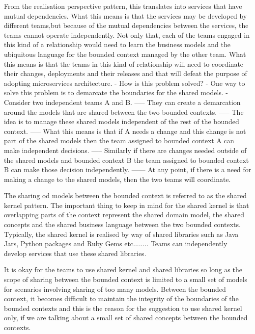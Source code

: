 \documentclass[a4paper, 11pt]{book}
\begin{document}
    From the realisation perspective pattern, this translates into services that have mutual dependencies.
    What this means is that the services may be developed by different teams,but because of the mutual dependencies between the services, the teams cannot operate independently.
    Not only that, each of the teams engaged in this kind of a relationship would need to learn the business models and the ubiquitous language for the bounded context managed by the other team.
    What this means is that the teams in this kind of relationship will need to coordinate their changes, deployments and their releases and that will defeat the purpose of adopting microservices architecture.
    - How is this problem solved?
    - One way to solve this problem is to demarcate the boundaries for the shared models.
    - Consider two independent teams A and B.
    ----- They can create a demarcation around the models that are shared between the two bounded contexts.
    ----- The idea is to manage these shared models independent of the rest of the bounded context.
    ----- What this means is that if A needs a change and this change is not part of the shared models then the team assigned to bounded context A can make independent decisions.
    ----- Similarly if there are changes needed outside of the shared models and bounded context B the team assigned to bounded context B can make those decision independently.
    ------ At any point, if there is a need for making a change to the shared models, then the two teams will coordinate.

    The sharing od models between the bounded context is referred to as the shared kernel pattern.
    The important thing to keep in mind for the shared kernel is that overlapping parts of the context represent the shared domain model, the shared concepts and the shared business language between the two bounded contexts.
    Typically, the shared kernel is realised by way of shared libraries such as Java Jars, Python packages and Ruby Gems etc........
    Teams can independently develop services that use these shared libraries.

    It is okay for the teams to use shared kernel and shared libraries so long as the scope of sharing between the bounded context is limited to a small set of models for scenarios involving sharing of too many models.
    Between the bounded context, it becomes difficult to maintain the integrity of the boundaries of the bounded contexts and this is the reason for the suggestion to use shared kernel only, if we are talking about a small set of shared concepts between the bounded contexts.
\end{document}
